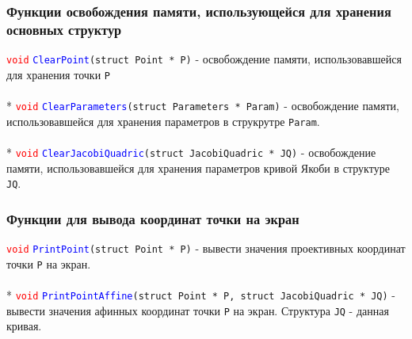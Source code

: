 \documentclass[12pt]{article}
\begin{document}
\subsubsection{Функции освобождения памяти, использующейся для хранения основных структур}
\textcolor{red}{\texttt{void}} \textcolor{blue}{\texttt{ClearPoint}}\texttt{(struct Point * P)} - освобождение памяти, использовавшейся для хранения точки \texttt{P}\\
\\*
\textcolor{red}{\texttt{void}} \textcolor{blue}{\texttt{ClearParameters}}\texttt{(struct Parameters * Param)} - освобождение памяти, использовавшейся для хранения параметров в струкрутре \texttt{Param}.\\
\\*
\textcolor{red}{\texttt{void}} \textcolor{blue}{\texttt{ClearJacobiQuadric}}\texttt{(struct JacobiQuadric * JQ)} - освобождение памяти, использовавшейся для хранения параметров кривой Якоби в структуре \texttt{JQ}.\\

\subsubsection{Функции для вывода координат точки на экран}
\textcolor{red}{\texttt{void}} \textcolor{blue}{\texttt{PrintPoint}}\texttt{(struct Point * P)} - вывести значения проективных координат точки \texttt{P} на экран.\\
\\*
\textcolor{red}{\texttt{void}} \textcolor{blue}{\texttt{PrintPointAffine}}\texttt{(struct Point * P, struct JacobiQuadric * JQ)} - вывести значения афинных координат точки \texttt{P} на экран. Структура \texttt{JQ} - данная кривая.\\
\end{document}
